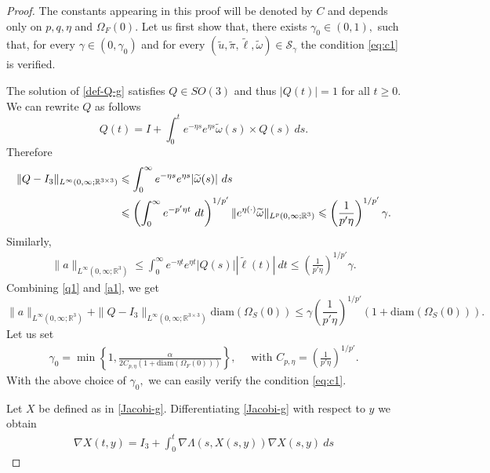 \documentclass[12pt,a4paper,reqno]{amsart}
\theoremstyle{definition}
\theoremstyle{remark}
\numberwithin{equation}{section}
\newcommand{\oso}{\Omega_{S}(0)}
\newcommand{\ofo}{\Omega_{F}(0)}
\newcommand{\rt}{\mathbb{R}^{3}}
\begin{document}
\begin{proof}
The constants appearing in this proof will be denoted by $C$ and depends only on $p,q,\eta$ and $\Omega_{F}(0).$  Let us first show that,  there exists $\gamma_{0} \in (0,1),$ such that, for every $\gamma \in (0, \gamma_{0})$ and for every  $(\widetilde u,\widetilde \pi,\widetilde \ell,\widetilde \omega)  \in {\mathcal S}_{\gamma}$ the condition \eqref{eq:c1} is verified.

The solution of \eqref{def-Q-g} satisfies $Q \in SO(3)$ and thus $|Q(t)| = 1$ for all $t\geqslant 0.$
We can rewrite $Q$ as follows
\begin{equation*}
Q(t) = I + \int_{0}^{t} e^{-\eta s} e^{\eta s} \widetilde \omega(s) \times Q(s)  \  ds.
\end{equation*}
Therefore
\begin{align} \label{q1}
\|Q - I_{3}\|_{L^{\infty}(0,\infty;\mathbb{R}^{3\times 3})} &\leqslant  \int_{0}^{\infty} e^{-\eta s} e^{\eta s} |\widetilde \omega(s)| \ ds \notag \\
& \leqslant \left(\int_{0}^{\infty} e^{-p'\eta t } \ dt \right)^{1/p'} \|e^{\eta (\cdot)}\widetilde\omega \|_{L^{p}(0,\infty;\rt)} \leqslant \left( \frac{1}{p'\eta}\right)^{1/p'} \gamma.
\end{align}
Similarly,
\begin{align} \label{a1}
\|a\|_{L^{\infty}(0,\infty;\rt)} \leqslant \int_{0}^{\infty}  e^{-\eta t} e^{\eta t} |Q(s)| |\widetilde \ell(t)| \ dt \leqslant \left( \frac{1}{p'\eta}\right)^{1/p'} \gamma.
\end{align}
Combining \eqref{q1} and \eqref{a1}, we get 
\begin{equation*}
\|a\|_{L^{\infty}(0,\infty;\rt)} + \|Q - I_{3}\|_{L^{\infty}(0,\infty;\mathbb{R}^{3 \times 3})}  \mathrm{diam} (\oso)  \leqslant \gamma \left( \frac{1}{p'\eta}\right)^{1/p'} (1 + \mathrm{diam} (\oso)).
\end{equation*}
Let us set
\begin{align} \label{gam0}
\gamma_{0} = \min\left\{1,   \frac{\alpha}{2C_{p,\eta} (1+ \mathrm{diam}(\ofo))}\right\}, \quad \mbox{ with } C_{p,\eta} = \left( \frac{1}{p'\eta}\right)^{1/p'}.
\end{align}
 With the above choice of $\gamma_{0},$ we can easily verify  the condition \eqref{eq:c1}.

Let $X$ be defined as in \eqref{Jacobi-g}. Differentiating \eqref{Jacobi-g} with respect to $y$ we obtain
\begin{align*}
\nabla X (t,y) = I_{3} +  \int_{0}^{t} \nabla \Lambda(s,X(s,y)) \nabla X(s,y) \ ds
\end{align*}


\end{proof}
\end{document}
